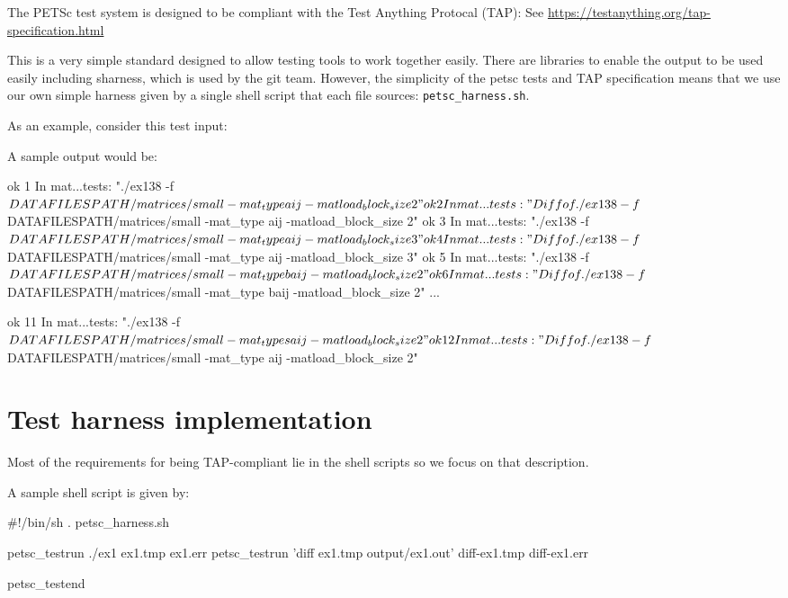 The PETSc test system is designed to be compliant with the Test Anything
Protocal (TAP): See \url{https://testanything.org/tap-specification.html}

This is a very simple standard designed to allow testing tools to work
together easily.  There are libraries to enable the output to be used
easily including sharness, which is used by the git team.  However, the
simplicity of the petsc tests and TAP specification means that we use
our own simple harness given by a single shell script that each file
sources: \lstinline{petsc_harness.sh}.

As an example, consider this test input:
%

A sample output would be:
\begin{outputlisting}[\scriptsize\ttfamily]
ok 1 In mat...tests: "./ex138 -f ${DATAFILESPATH}/matrices/small -mat_type aij -matload_block_size 2"
ok 2 In mat...tests: "Diff of ./ex138 -f ${DATAFILESPATH}/matrices/small -mat_type aij -matload_block_size 2"
ok 3 In mat...tests: "./ex138 -f ${DATAFILESPATH}/matrices/small -mat_type aij -matload_block_size 3"
ok 4 In mat...tests: "Diff of ./ex138 -f ${DATAFILESPATH}/matrices/small -mat_type aij -matload_block_size 3"
ok 5 In mat...tests: "./ex138 -f ${DATAFILESPATH}/matrices/small -mat_type baij -matload_block_size 2"
ok 6 In mat...tests: "Diff of ./ex138 -f ${DATAFILESPATH}/matrices/small -mat_type baij -matload_block_size 2"
...

ok 11 In mat...tests: "./ex138 -f ${DATAFILESPATH}/matrices/small -mat_type saij -matload_block_size 2"
ok 12 In mat...tests: "Diff of ./ex138 -f ${DATAFILESPATH}/matrices/small -mat_type aij -matload_block_size 2"
\end{outputlisting}

\section{Test harness implementation%
  \label{test-harness-implementation}%
}

Most of the requirements for being TAP-compliant lie in the shell
scripts so we focus on that description.

A sample shell script is given by:
\begin{bashlisting}
#!/bin/sh
. petsc_harness.sh

petsc_testrun ./ex1 ex1.tmp ex1.err
petsc_testrun 'diff ex1.tmp output/ex1.out' diff-ex1.tmp diff-ex1.err

petsc_testend
\end{bashlisting}

